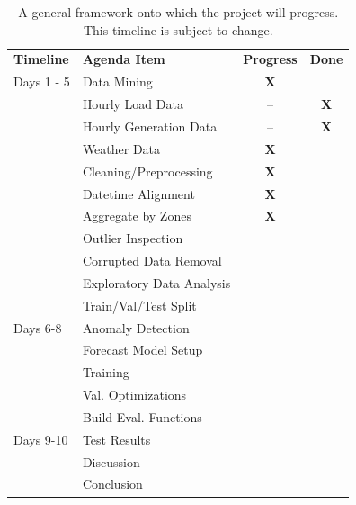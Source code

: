 \documentclass[sigconf]{acmart}
\begin{document}
\begin{table}[hbt!]
\centering
\caption{A general framework onto which the project will progress. This timeline is subject to change.}
\begin{tabular}{ll | c | c}
\toprule
\textbf{Timeline} & \textbf{Agenda Item} & \hfil \textbf{Progress} & \hfil \textbf{Done} \\
\cmidrule(rl){1-1}\cmidrule(rl){2-2}\cmidrule(rl){3-3}\cmidrule(rl){4-4}
  Days 1 - 5 & Data Mining & \textbf{X} & \\
  \cmidrule(rl){1-4}
   & \hspace{3mm}Hourly Load Data & -- & \textbf{X} \\   
   & \hspace{3mm}Hourly Generation Data & -- & \textbf{X} \\   
   & \hspace{3mm}Weather Data & \textbf{X} & \\   
   & Cleaning/Preprocessing & \textbf{X} & \\  
   \cmidrule(rl){2-4} 
   & \hspace{3mm}Datetime Alignment & \textbf{X} & \\   
   & \hspace{3mm}Aggregate by Zones & \textbf{X} & \\   
   & \hspace{3mm}Outlier Inspection & & \\   
   & \hspace{3mm}Corrupted Data Removal & & \\  
   & Exploratory Data Analysis & & \\  
   \cmidrule(rl){2-4} 
   & Train/Val/Test Split & & \\  
   \cmidrule(rl){2-4} 
  Days 6-8 & Anomaly Detection & & \\  
   \cmidrule(rl){1-4} 
   & Forecast Model Setup & & \\  
   \cmidrule(rl){2-4} 
   & \hspace{3mm}Training & & \\  
   & \hspace{3mm}Val. Optimizations & & \\  
   & Build Eval. Functions & & \\  
   \cmidrule(rl){2-4} 
  Days 9-10 & Test Results & & \\  
  \cmidrule(rl){1-4} 
   & Discussion & & \\
   \cmidrule(rl){2-4}   
   & Conclusion & & \\  
   \cmidrule(rl){2-4} 
  \bottomrule
\end{tabular}
\end{table}
\end{document}
